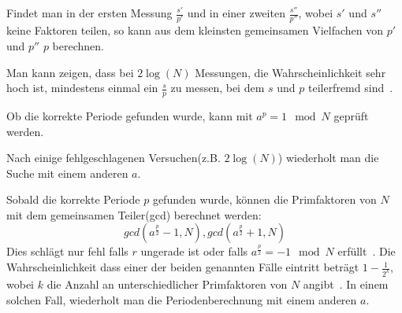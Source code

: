 Findet man in der ersten Messung \(\frac{s'}{p'}\) und in einer zweiten \(\frac{s''}{p''}\), 
wobei \(s'\) und \(s''\) keine Faktoren teilen,
so kann aus dem kleinsten gemeinsamen Vielfachen von \(p'\) und \(p''\) \(p\) berechnen.

Man kann zeigen, 
dass bei \(2\log(N)\) Messungen, die Wahrscheinlichkeit sehr hoch ist, mindestens einmal ein \(\frac{s}{p}\)
zu messen, bei dem \(s\) und \(p\) teilerfremd sind~\cite*{nielsen_chuang_2010}.

Ob die korrekte Periode gefunden wurde, kann mit \(a^p = 1 \mod N\) geprüft werden.

Nach einige fehlgeschlagenen Versuchen(z.B. \(2\log(N)\)) wiederholt man die Suche mit einem anderen \(a\).

Sobald die korrekte Periode \(p\) gefunden wurde, 
können die Primfaktoren von \(N\)mit dem gemeinsamen Teiler(gcd) berechnet werden:
\[gcd(a^{\frac{p}{2}}-1, N), gcd(a^{\frac{p}{2}}+1, N)\]
Dies schlägt nur fehl falls \(r\) ungerade ist
oder falls \(a^{\frac{p}{2}} = -1 \mod N\) erfüllt~\cite*{Shor_1997}.
Die Wahrscheinlichkeit dass einer der beiden genannten Fälle eintritt beträgt \(1-\frac{1}{2^k}\), 
wobei \(k\) die Anzahl an unterschiedlicher Primfaktoren von \(N\) angibt~\cite*{Shor_1997}.
In einem solchen Fall, wiederholt man die Periodenberechnung mit einem anderen \(a\).




